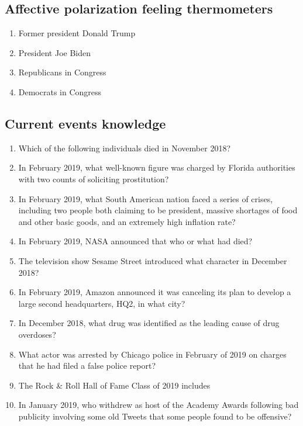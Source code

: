 \documentclass{article}\usepackage[]{graphicx}\usepackage[]{xcolor}
\begin{document}
\subsection{Affective polarization feeling thermometers}
\begin{enumerate}

\item Former president Donald Trump

\item President Joe Biden

\item Republicans in Congress

\item Democrats in Congress

\end{enumerate}

\subsection{Current events knowledge}
\begin{enumerate}
\item  Which of the following individuals died in
November 2018?
\item In February 2019, what well-known figure was
charged by Florida authorities with two counts of
soliciting prostitution?
\item In February 2019, what South American nation
faced a series of crises, including two people
both claiming to be president, massive shortages
of food and other basic goods, and an extremely
high inflation rate?
\item In February 2019, NASA announced that who or what
had died?
\item The television show Sesame Street introduced what
character in December 2018?
\item In February 2019, Amazon announced it was
canceling its plan to develop a large second
headquarters, HQ2, in what city?
\item In December 2018, what drug was identified as the
leading cause of drug overdoses?
\item What actor was arrested by Chicago police in
February of 2019 on charges that he had filed a
false police report?
\item The Rock \& Roll Hall of Fame Class of 2019
includes
\item In January 2019, who withdrew as host of the
Academy Awards following bad publicity involving
some old Tweets that some people found to be
offensive?
\end{enumerate}
\end{document}
